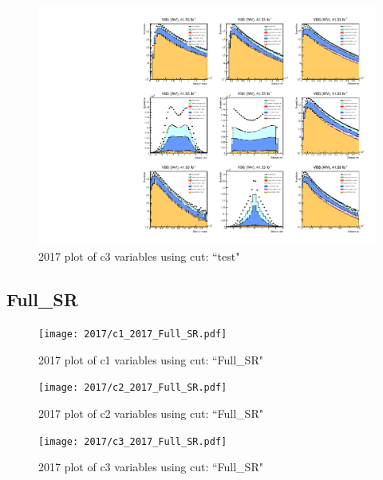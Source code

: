 \documentclass{article}
\begin{document}
                        \begin{figure}[H]
                            \centering
                            \caption{2017 plot of c3 variables using cut: ``test"}
                            \includegraphics[width=\textwidth]{2017/c3_2017_test.pdf}
                        \end{figure}    
      \subsection*{Full\_SR}
                        \begin{figure}[H]
                            \centering
                            \caption{2017 plot of c1 variables using cut: ``Full\_SR"}
                            \texttt{[image: 2017/c1\_2017\_Full\_SR.pdf]}
                        \end{figure}    
                        \begin{figure}[H]
                            \centering
                            \caption{2017 plot of c2 variables using cut: ``Full\_SR"}
                            \texttt{[image: 2017/c2\_2017\_Full\_SR.pdf]}
                        \end{figure}    
                        \begin{figure}[H]
                            \centering
                            \caption{2017 plot of c3 variables using cut: ``Full\_SR"}
                            \texttt{[image: 2017/c3\_2017\_Full\_SR.pdf]}
                        \end{figure}    
\end{document}
